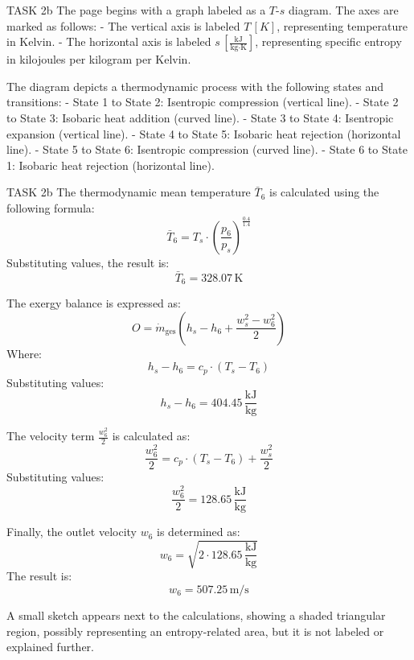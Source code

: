 TASK 2b  
The page begins with a graph labeled as a \( T \)-\( s \) diagram. The axes are marked as follows:  
- The vertical axis is labeled \( T \, [K] \), representing temperature in Kelvin.  
- The horizontal axis is labeled \( s \, \left[\frac{\text{kJ}}{\text{kg·K}}\right] \), representing specific entropy in kilojoules per kilogram per Kelvin.  

The diagram depicts a thermodynamic process with the following states and transitions:  
- State 1 to State 2: Isentropic compression (vertical line).  
- State 2 to State 3: Isobaric heat addition (curved line).  
- State 3 to State 4: Isentropic expansion (vertical line).  
- State 4 to State 5: Isobaric heat rejection (horizontal line).  
- State 5 to State 6: Isentropic compression (curved line).  
- State 6 to State 1: Isobaric heat rejection (horizontal line).  

TASK 2b  
The thermodynamic mean temperature \( \bar{T}_6 \) is calculated using the following formula:  
\[
\bar{T}_6 = T_s \cdot \left(\frac{p_6}{p_s}\right)^{\frac{0.4}{1.4}}
\]  
Substituting values, the result is:  
\[
\bar{T}_6 = 328.07 \, \text{K}
\]  

The exergy balance is expressed as:  
\[
O = \dot{m}_{\text{ges}} \left(h_s - h_6 + \frac{w_s^2 - w_6^2}{2}\right)
\]  
Where:  
\[
h_s - h_6 = c_p \cdot (T_s - T_6)
\]  
Substituting values:  
\[
h_s - h_6 = 404.45 \, \frac{\text{kJ}}{\text{kg}}
\]  

The velocity term \( \frac{w_6^2}{2} \) is calculated as:  
\[
\frac{w_6^2}{2} = c_p \cdot (T_s - T_6) + \frac{w_s^2}{2}
\]  
Substituting values:  
\[
\frac{w_6^2}{2} = 128.65 \, \frac{\text{kJ}}{\text{kg}}
\]  

Finally, the outlet velocity \( w_6 \) is determined as:  
\[
w_6 = \sqrt{2 \cdot 128.65 \, \frac{\text{kJ}}{\text{kg}}}
\]  
The result is:  
\[
w_6 = 507.25 \, \text{m/s}
\]  

A small sketch appears next to the calculations, showing a shaded triangular region, possibly representing an entropy-related area, but it is not labeled or explained further.